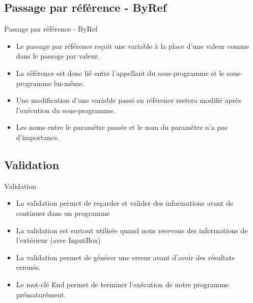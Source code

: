 \documentclass[aspectratio=169,usenames,dvipsnames]{beamer}
\begin{document}
    \subsection{Passage par référence - ByRef}
    \begin{frame}{Passage par référence - ByRef}
        \begin{itemize}
            \item Le passage par référence reçoit une variable à la place d’une valeur comme dans le passage par valeur.
            \item La référence est donc lié entre l’appellant du sous-programme et le sous-programme lui-même.
            \item Une modification d’une variable passé en référence restera modifié après l’exécution du sous-programme.
            \item Les noms entre le paramètre passée et le nom du paramètre n’a pas d’importance.
        \end{itemize}
    \end{frame}
    \subsection{Validation}
    \begin{frame}{Validation}
        \begin{itemize}
            \item La validation permet de regarder et valider des informations avant de continuer dans un programme
            \item La validation est surtout utilisée quand nous recevons des informations de l’extérieur (avec InputBox)
            \item La validation permet de générer une erreur avant d’avoir des résultats erronés. 
            \item Le mot-clé \alert{End} permet de terminer l'exécution de notre programme prématurément.
        \end{itemize}
    \end{frame}
\end{document}
